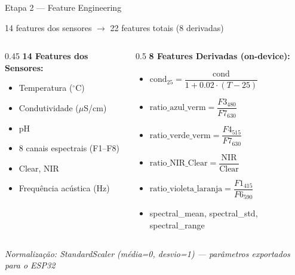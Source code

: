 \documentclass[aspectratio=169, 11pt]{beamer}
\begin{document}
\begin{frame}{Etapa 2 — Feature Engineering}
  \begin{block}{14 features dos sensores $\rightarrow$ 22 features totais (8 derivadas)}
  \end{block}
  \vspace{0.2cm}
  \begin{columns}[T]
    \begin{column}{0.45\textwidth}
      \textbf{14 Features dos Sensores:}
      \begin{itemize}
        \item Temperatura ($^\circ$C)
        \item Condutividade ($\mu$S/cm)
        \item pH
        \item 8 canais espectrais (F1--F8)
        \item Clear, NIR
        \item Frequência acústica (Hz)
      \end{itemize}
    \end{column}
    \begin{column}{0.5\textwidth}
      \textbf{8 Features Derivadas (on-device):}
      \begin{itemize}
        \item $\text{cond}_{25} = \dfrac{\text{cond}}{1 + 0.02 \cdot (T - 25)}$
        \vspace{0.1cm}
        \item $\text{ratio\_azul\_verm} = \dfrac{F3_{480}}{F7_{630}}$
        \vspace{0.1cm}
        \item $\text{ratio\_verde\_verm} = \dfrac{F4_{515}}{F7_{630}}$
        \vspace{0.1cm}
        \item $\text{ratio\_NIR\_Clear} = \dfrac{\text{NIR}}{\text{Clear}}$
        \vspace{0.1cm}
        \item $\text{ratio\_violeta\_laranja} = \dfrac{F1_{415}}{F6_{590}}$
        \vspace{0.1cm}
        \item spectral\_mean, spectral\_std, spectral\_range
      \end{itemize}
    \end{column}
  \end{columns}
  \vspace{0.3cm}
  \begin{center}
    \small\textit{Normalização: StandardScaler (média=0, desvio=1) — parâmetros exportados para o ESP32}
  \end{center}
\end{frame}
\end{document}
